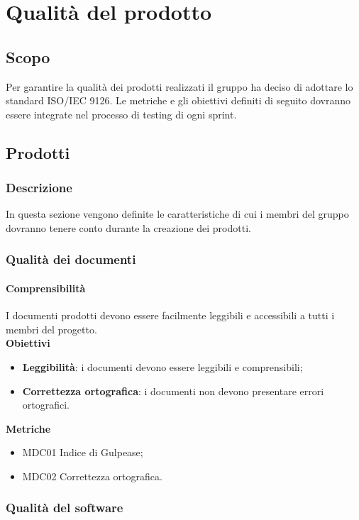 \section{Qualità del prodotto}
\subsection{Scopo}
Per garantire la qualità dei prodotti realizzati il gruppo \gruppo{} ha deciso di adottare lo standard ISO/IEC 9126.
Le metriche e gli obiettivi definiti di seguito dovranno essere integrate nel processo di testing di ogni sprint.
\subsection{Prodotti}
\subsubsection{Descrizione}
In questa sezione vengono definite le caratteristiche di cui i membri del gruppo \gruppo{} dovranno tenere conto durante la creazione dei prodotti.
\subsubsection{Qualità dei documenti}

\paragraph{Comprensibilità}
I documenti prodotti devono essere facilmente leggibili e accessibili a tutti i membri del progetto. \\

\textbf{Obiettivi}
\begin{itemize}
\item \textbf{Leggibilità}: i documenti devono essere leggibili e comprensibili;
\item \textbf{Correttezza ortografica}: i documenti non devono presentare errori ortografici.
\end{itemize}

\textbf{Metriche}
\begin{itemize}
\item MDC01 Indice di Gulpease;
\item MDC02 Correttezza ortografica.
\end{itemize}

\subsubsection{Qualità del software}

